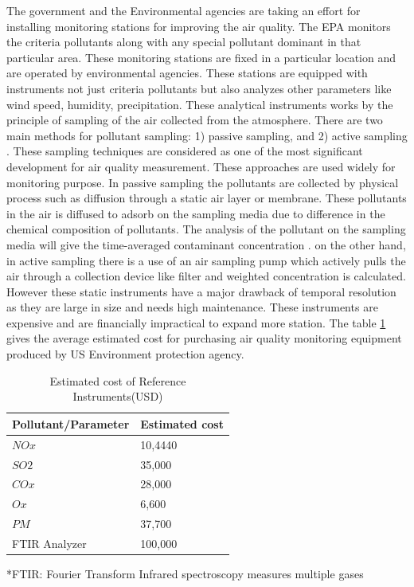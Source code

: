 The government and the Environmental agencies are taking an effort for installing monitoring stations for improving the air quality. The EPA monitors the criteria pollutants along with any special pollutant dominant in that particular area. These monitoring stations are fixed in a particular location and are operated by environmental agencies. These stations are equipped with instruments not just criteria pollutants but also analyzes other parameters like wind speed, humidity, precipitation. These analytical instruments works by the principle of sampling of the air collected from the atmosphere.
There are two main methods for pollutant sampling: 1) passive sampling, and 2) active sampling \cite{Balakrishnan2015} \cite{activepassive}. These sampling techniques are considered as one of the most significant development for air quality measurement. These approaches are used widely for monitoring purpose. In passive sampling the pollutants are collected by physical process such as diffusion through a static air layer or membrane. These pollutants in the air is diffused to adsorb on the sampling media due to difference in the chemical composition of pollutants. The analysis of the pollutant on the sampling media will give the time-averaged contaminant concentration \cite{Environment2009}. on the other hand, in active sampling there is a use of an air sampling pump which actively pulls the air through a collection device like filter  and weighted concentration is calculated. However these static instruments have a major drawback of temporal resolution as they are large in size and needs high maintenance. These instruments are expensive and are financially impractical to expand more station. The table \ref{table:cost} gives the average estimated cost for purchasing air quality monitoring equipment produced by US Environment protection agency. 

\begin{table}[h]
  
  
    \begin{tabularx}{\columnwidth}{X|X}
        \hline
        Pollutant/Parameter           & Estimated cost    \\
        \hline
    
      $NOx$   & 10,4440  \\ 
      $SO2$   & 35,000  \\ 
      $COx$   & 28,000  \\ 
      $Ox$   & 6,600  \\ 
      $PM$   & 37,700  \\ 
     
      FTIR Analyzer   & 100,000 \\ \hline
     
        
      
  \end{tabularx}
  *FTIR: Fourier Transform Infrared spectroscopy measures multiple gases 
    \caption{Estimated cost of Reference Instruments(USD) \cite{Mussatti2000}}
    \label{table:cost}
  \end{table}


